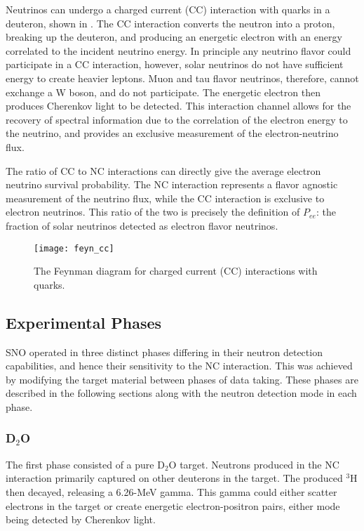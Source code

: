 Neutrinos can undergo a charged current (CC) interaction with quarks in a deuteron, shown in .
The CC interaction converts the neutron into a proton, breaking up the deuteron, and producing an energetic electron with an energy correlated to the incident neutrino energy.
In principle any neutrino flavor could participate in a CC interaction, however, solar neutrinos do not have sufficient energy to create heavier leptons.
Muon and tau flavor neutrinos, therefore, cannot exchange a W boson, and do not participate.
The energetic electron then produces Cherenkov light to be detected.
This interaction channel allows for the recovery of spectral information due to the correlation of the electron energy to the neutrino, and provides an exclusive measurement of the electron-neutrino flux. 


The ratio of CC to NC interactions can directly give the average electron neutrino survival probability.
The NC interaction represents a flavor agnostic measurement of the neutrino flux, while the CC interaction is exclusive to electron neutrinos.
This ratio of the two is precisely the definition of $P_{ee}$: the fraction of solar neutrinos detected as electron flavor neutrinos.

\begin{figure}
\centering
\texttt{[image: feyn\_cc]}
\caption{\label{fig:CC}The Feynman diagram for charged current (CC) interactions with quarks.}
\end{figure}

\subsection{Experimental Phases}

SNO operated in three distinct phases differing in their neutron detection capabilities, and hence their sensitivity to the NC interaction.
This was achieved by modifying the target material between phases of data taking.
These phases are described in the following sections along with the neutron detection mode in each phase.

\subsubsection{D$_2$O}

The first phase consisted of a pure D$_2$O target. 
Neutrons produced in the NC interaction primarily captured on other deuterons in the target.
The produced $^3$H then decayed, releasing a 6.26-MeV gamma.
This gamma could either scatter electrons in the target or create energetic electron-positron pairs, either mode being detected by Cherenkov light.

